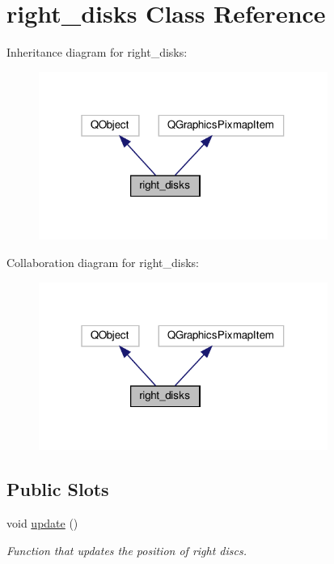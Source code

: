\hypertarget{classright__disks}{}\section{right\+\_\+disks Class Reference}
\label{classright__disks}


Inheritance diagram for right\+\_\+disks\+:\nopagebreak
\begin{figure}[H]
\begin{center}
\leavevmode
\includegraphics[width=268pt]{classright__disks__inherit__graph}
\end{center}
\end{figure}


Collaboration diagram for right\+\_\+disks\+:\nopagebreak
\begin{figure}[H]
\begin{center}
\leavevmode
\includegraphics[width=268pt]{classright__disks__coll__graph}
\end{center}
\end{figure}
\subsection*{Public Slots}
\begin{DoxyCompactItemize}
\item 
void \hyperlink{classright__disks_a2dae29bf05aef3c3171d57f2aa7fa33f}{update} ()
\begin{DoxyCompactList}\small\item\em Function that updates the position of right discs. \end{DoxyCompactList}\end{DoxyCompactItemize}
